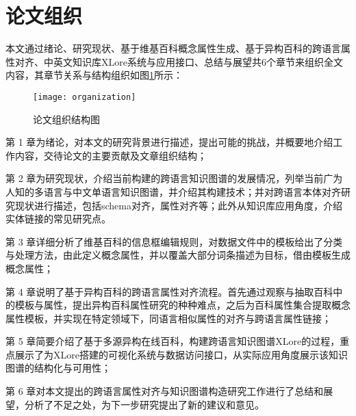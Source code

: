 \section{论文组织}

本文通过绪论、研究现状、基于维基百科概念属性生成、基于异构百科的跨语言属性对齐、中英文知识库XLore系统与应用接口、总结与展望共6个章节来组织全文内容，其章节关系与结构组织如图\ref{fig:organization}所示：

\begin{figure}[ht] %
  \centering
  \texttt{[image: organization]}
  \caption{论文组织结构图}
  \label{fig:organization}
\end{figure}

第 1 章为绪论，对本文的研究背景进行描述，提出可能的挑战，并概要地介绍工作内容，交待论文的主要贡献及文章组织结构；

第 2 章为研究现状，介绍当前构建的跨语言知识图谱的发展情况，列举当前广为人知的多语言与中文单语言知识图谱，并介绍其构建技术；并对跨语言本体对齐研究现状进行描述，包括schema对齐，属性对齐等；此外从知识库应用角度，介绍实体链接的常见研究点。

第 3 章详细分析了维基百科的信息框编辑规则，对数据文件中的模板给出了分类与处理方法，由此定义概念属性，并以覆盖大部分词条描述为目标，借由模板生成概念属性；

第 4 章说明了基于异构百科的跨语言属性对齐流程。首先通过观察与抽取百科中的模板与属性，提出异构百科属性研究的种种难点，之后为百科属性集合提取概念属性模板，并实现在特定领域下，同语言相似属性的对齐与跨语言属性链接；

第 5 章简要介绍了基于多源异构在线百科，构建跨语言知识图谱XLore的过程，重点展示了为XLore搭建的可视化系统与数据访问接口，从实际应用角度展示该知识图谱的结构化与可用性；

第 6 章对本文提出的跨语言属性对齐与知识图谱构造研究工作进行了总结和展望，分析了不足之处，为下一步研究提出了新的建议和意见。

